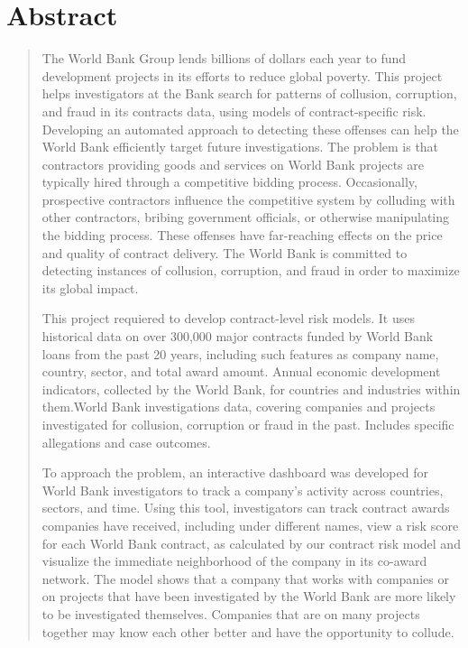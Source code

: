 \section*{\centering  \normalsize{Abstract} }
\begin{quotation}
\small
\noindent The World Bank Group lends billions of dollars each year to fund development projects in its efforts to reduce global poverty. This project helps investigators at the Bank search for patterns of collusion, corruption, and fraud in its contracts data, using models of contract-specific risk. Developing an automated approach to detecting these offenses can help the World Bank efficiently target future investigations. The problem is that contractors providing goods and services on World Bank projects are typically hired through a competitive bidding process. Occasionally, prospective contractors influence the competitive system by colluding with other contractors, bribing government officials, or otherwise manipulating the bidding process. These offenses have far-reaching effects on the price and quality of contract delivery. The World Bank is committed to detecting instances of collusion, corruption, and fraud in order to maximize its global impact. 

This project requiered to develop contract-level risk models. It uses historical data on over 300,000 major contracts funded by World Bank loans from the past 20 years, including such features as company name, country, sector, and total award amount. Annual economic development indicators, collected by the World Bank, for countries and industries within them.World Bank investigations data, covering companies and projects investigated for collusion, corruption or fraud in the past. Includes specific allegations and case outcomes.

To approach the problem,  an interactive dashboard was developed for World Bank investigators to track a company’s activity across countries, sectors, and time. Using this tool, investigators can track contract awards companies have received, including under different names, view a risk score for each World Bank contract, as calculated by our contract risk model and visualize the immediate neighborhood of the company in its co-award network.
The model shows that a company that works with companies or on projects that have been investigated by the World Bank are more likely to be investigated themselves. Companies that are on many projects together may know each other better and have the opportunity to collude.


\end{quotation}
